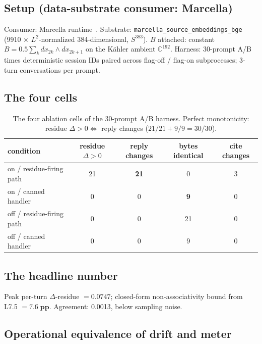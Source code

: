 \documentclass[11pt,letterpaper]{article}
\begin{document}
\subsection{Setup (data-substrate consumer: Marcella)}

Consumer: Marcella runtime~\cite{davis2026sheafcomposition}.
Substrate: \texttt{marcella\_source\_embeddings\_bge} (9910 $\times$
$L^2$-normalized 384-dimensional, $S^{383}$). $B$ attached: constant
$B = 0.5 \sum_k dx_{2k} \wedge dx_{2k+1}$ on the K\"ahler ambient
$\mathbb{C}^{192}$. Harness: 30-prompt A/B times deterministic
session IDs paired across flag-off / flag-on subprocesses; 3-turn
conversations per prompt.

\subsection{The four cells}

\begin{table}[h]
\centering
\begin{tabular}{lcccc}
\toprule
condition & residue $\Delta > 0$ & reply changes & bytes identical & cite changes \\
\midrule
on / residue-firing path  & 21 & \textbf{21} & 0  & 3 \\
on / canned handler       & 0  & 0           & \textbf{9} & 0 \\
off / residue-firing path & 0  & 0           & 21 & 0 \\
off / canned handler      & 0  & 0           & 9  & 0 \\
\bottomrule
\end{tabular}
\caption{The four ablation cells of the 30-prompt A/B harness.
Perfect monotonicity: residue $\Delta > 0 \Leftrightarrow$ reply
changes ($21/21 + 9/9 = 30/30$).}
\label{tab:fourcells}
\end{table}

\subsection{The headline number}

Peak per-turn $\Delta$-residue $= \mathbf{0.0747}$; closed-form
non-associativity bound from L7.5 $= \mathbf{7.6\;\text{pp}}$.
Agreement: 0.0013, below sampling noise.

\subsection{Operational equivalence of drift and meter}
\end{document}
